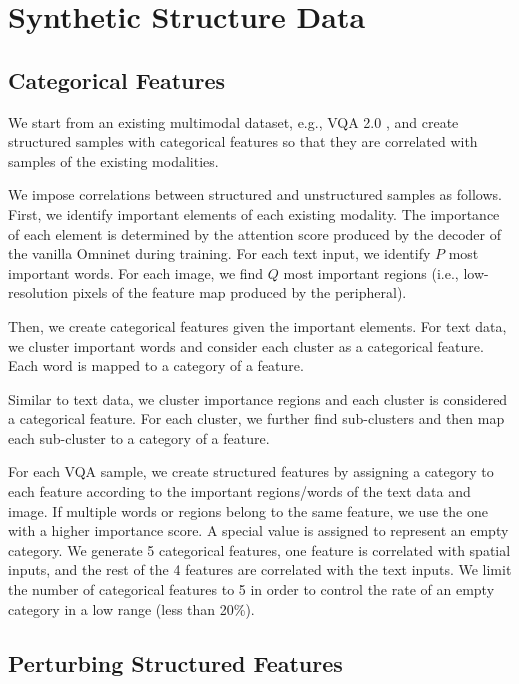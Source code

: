 \documentclass{article}
\begin{document}
\clearpage

\appendix

\section{Synthetic Structure Data}\label{a:svqa}

\subsection{Categorical Features}

We start from an existing multimodal dataset, e.g., VQA 2.0 \cite{goyal2017making}, and create structured samples with categorical features so that they are correlated with samples of the existing modalities.

We impose correlations between structured and unstructured samples as follows. First, we identify important elements of each existing modality. The importance of each element is determined by the attention score produced by the decoder of the vanilla Omninet during training. For each text input, we identify $P$ most important words. For each image, we find $Q$ most important regions (i.e., low-resolution pixels of the feature map produced by the peripheral). 

Then, we create categorical features given the important elements. For text data, we cluster important words and consider each cluster as a categorical feature. Each word is mapped to a category of a feature. 

Similar to text data, we cluster importance regions and each cluster is considered a categorical feature. For each cluster, we further find sub-clusters and then map each sub-cluster to a category of a feature.

For each VQA sample, we create structured features by assigning a category to each feature according to the important regions/words of the text data and image. If multiple words or regions belong to the same feature, we use the one with a higher importance score. A special value is assigned to represent an empty category. We generate 5 categorical features, one feature is correlated with spatial inputs, and the rest of the 4 features are correlated with the text inputs. We limit the number of categorical features to 5 in order to control the rate of an empty category in a low range (less than 20\%).

\subsection{Perturbing Structured Features}
\end{document}
